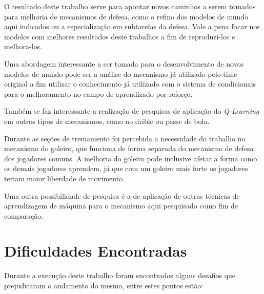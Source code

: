 O resultado deste trabalho serve para apontar novos caminhos a serem tomados
para melhoria de mecanismos de defesa, como o refino dos modelos de mundo aqui indicados
ou a especialização em subtarefas da defesa. Vale a pena focar nos modelos com
melhores resultados deste trabalhos a fim de reproduzi-los e melhora-los.

Uma abordagem interessante a ser tomada para o desenvolvimento de novos modelos
de mundo pode ser a análise do mecanismo já utilizado pelo time original a fim
utilizar o conhecimento já utilizado com o sistema de condicionais para o
melhoramento no campo de aprendizado por reforço.

Também se faz interessante a realização de pesquisas de aplicação do
\textit{Q-Learning} em outros tipos de mecanismos, como no drible ou passe de
bola.

Durante as seções de treinamento foi percebida a necessidade do trabalho no
mecanismo do goleiro, que funciona de forma separada do mecanismo de defesa dos
jogadores comuns. A melhoria do goleiro pode inclusive afetar a forma como os
demais jogadores aprendem, já que com um goleiro mais forte os jogadores teriam
maior liberdade de movimento.

Uma outra possibilidade de pesquisa é a de aplicação de outras técnicas de
aprendizagem de máquina para o mecanismo aqui pesquisado como fim de comparação.

\section{Dificuldades Encontradas}

Durante a execução deste trabalho foram encontrados alguns desafios que
prejudicaram o andamento do mesmo, entre estes pontos estão:

